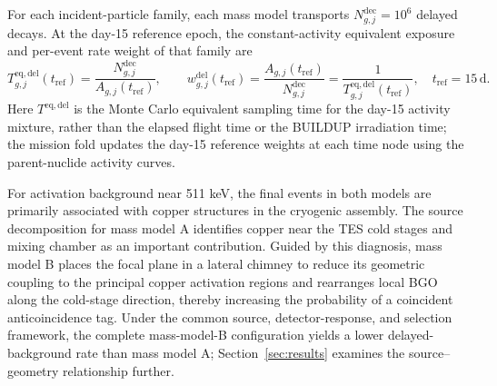 \documentclass[11pt]{article}
\begin{document}
\begingroup

For each incident-particle family, each mass model
transports $N^{\mathrm{dec}}_{g,j}=10^6$ delayed decays. At the day-15 reference
epoch, the constant-activity equivalent exposure and per-event rate weight of
that family are
\begin{equation}
 T^{\mathrm{eq,del}}_{g,j}(t_{\mathrm{ref}})
 =\frac{N^{\mathrm{dec}}_{g,j}}{A_{g,j}(t_{\mathrm{ref}})},
 \qquad
 w^{\mathrm{del}}_{g,j}(t_{\mathrm{ref}})
 =\frac{A_{g,j}(t_{\mathrm{ref}})}{N^{\mathrm{dec}}_{g,j}}
 =\frac{1}{T^{\mathrm{eq,del}}_{g,j}(t_{\mathrm{ref}})},
 \quad t_{\mathrm{ref}}=15\,\mathrm{d}.
 \label{eq:delayed_equivalent_exposure}
\end{equation}
Here $T^{\mathrm{eq,del}}$ is the Monte Carlo equivalent sampling time for the
day-15 activity mixture, rather than the elapsed flight time or the BUILDUP
irradiation time; the mission fold updates the day-15 reference weights at each
time node using the parent-nuclide activity curves.
\endgroup

\begingroup

For activation background near 511 keV, the final
events in both models are primarily associated with copper structures in the
cryogenic assembly. The source decomposition for mass model A identifies
copper near the TES cold stages and mixing chamber as an important
contribution. Guided by this diagnosis, mass model B places the focal plane in
a lateral chimney to reduce its geometric coupling to the principal copper
activation regions and rearranges local BGO along the cold-stage direction,
thereby increasing the probability of a coincident anticoincidence tag. Under
the common source, detector-response, and selection framework, the complete
mass-model-B configuration yields a lower delayed-background rate than mass
model A; Section~\ref{sec:results} examines the source--geometry relationship
further.
\endgroup

\begingroup
\end{document}
